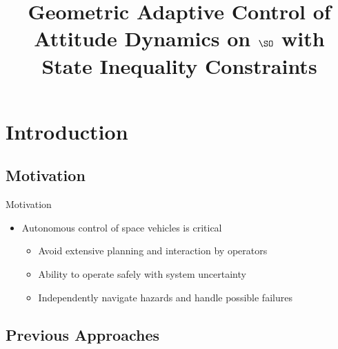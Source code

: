 \documentclass[11pt,professionalfonts]{beamer}
\title[Constrained Attitude Control on \( \SO \)]{\large\bf  Geometric Adaptive Control of Attitude Dynamics on \(\SO \) with State Inequality Constraints}
\author{\vspace*{-0.3cm}}
\institute{
	\footnotesize
	{\normalsize\bf{Shankar Kulumani, Christopher Poole, and Taeyoung Lee}}\\
	\vspace*{0.2cm}
  	\textbf{Flight Dynamics \& Control Lab}\\ \vspace*{0.5cm}
 	\begin{figure} %
       	\texttt{[image: gw\_txh\_2cs\_pos]}
  	\end{figure}
}
\date{}
\begin{document}

\setcounter{framenumber}{-1}
\begin{frame} %
  \titlepage
\end{frame}   %

\section*{Introduction}
\subsection*{Motivation}  

\begin{frame}[t]{Motivation} %
\begin{itemize}
	\item Autonomous control of space vehicles is critical
	\begin{itemize}
		\item Avoid extensive planning and interaction by operators
		\item Ability to operate safely with system uncertainty 
		\item Independently navigate hazards and handle possible failures
	\end{itemize}
\end{itemize}
\end{frame}   %

\subsection*{Previous Approaches}
\end{document}
